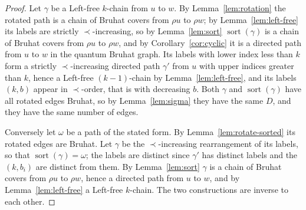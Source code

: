 \documentclass[11pt]{article}
\begin{document}
\begin{proof}
Let $\gamma$ be a Left-free $k$-chain from $u$ to $w$. By
Lemma~\ref{lem:rotation} the rotated path is a chain of Bruhat covers
from $\rho u$ to $\rho w$; by Lemma~\ref{lem:left-free} its labels are
strictly $\prec$-increasing, so by Lemma~\ref{lem:sort}
$\operatorname{sort}(\gamma)$ is a chain of Bruhat covers from
$\rho u$ to $\rho w$, and by Corollary~\ref{cor:cyclic} it is a
directed path from $u$ to $w$ in the quantum Bruhat graph. Its labels
with lower index less than $k$ form a strictly $\prec$-increasing
directed path $\gamma'$ from $u$ with upper indices greater than $k$,
hence a Left-free $(k-1)$-chain by Lemma~\ref{lem:left-free}, and its
labels $(k,b)$ appear in $\prec$-order, that is with decreasing $b$.
Both $\gamma$ and $\operatorname{sort}(\gamma)$ have all rotated
edges Bruhat, so by Lemma~\ref{lem:sigma} they have the same $D$, and
they have the same number of edges.

Conversely let $\omega$ be a path of the stated form. By
Lemma~\ref{lem:rotate-sorted} its rotated edges are Bruhat. Let
$\gamma$ be the $\prec$-increasing rearrangement of its labels, so
that $\operatorname{sort}(\gamma)=\omega$; the labels are distinct
since $\gamma'$ has distinct labels and the $(k,b_i)$ are distinct
from them. By Lemma~\ref{lem:sort} $\gamma$ is a chain of Bruhat
covers from $\rho u$ to $\rho w$, hence a directed path from $u$ to
$w$, and by Lemma~\ref{lem:left-free} a Left-free $k$-chain. The two
constructions are inverse to each other.
\end{proof}
\end{document}
